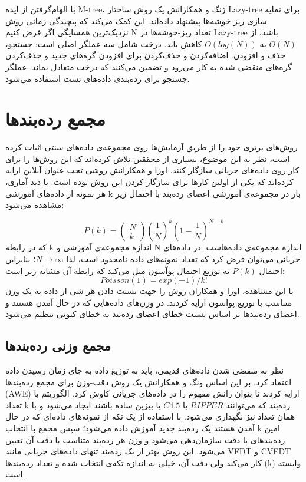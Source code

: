 با الهام‌گرفتن از ایده M-tree، ژنگ و همکارانش  \cite{zhang2011enabling} یک روش ساختار Lazy-tree برای نمایه سازی ریز-خوشه‌ها پیشنهاد داده‌اند. این کمک می‌کند که پیچیدگی زمانی روش‌ نزدیک‌ترین همسایگی اگر فرض کنیم N تعداد ریز-خوشه‌ها در Lazy-tree باشد، از $O(N)$ به $ O(log(N))$ کاهش یابد. درخت شامل سه عملگر اصلی است: جستجو، حذف و افزودن. اضافه‌کردن و حذف‌کردن برای افزودن گره‌های جدید و حذف‌کردن گره‌های منقضی شده به کار‌ می‌رود و تضمین می‌کنند که درخت متعادل بماند. عملگر جستجو برای رده‌بندی داده‌های تست استفاده می‌شود.


\section{مجمع رده‌بندها}
روش‌های
برتری خود را از طریق آزمایش‌ها روی مجموعه‌ی داده‌های سنتی اثبات کرده‌ است، نظر به این موضوع، بسیاری از محققین تلاش کرده‌اند که این روش‌ها را برای کار روی داده‌های جریانی سازگار کنند.
اوزا
و همکارانش \cite{oza2005online} روشی تحت عنوان
آنلاین ارایه کرده‌اند که یکی از اولین‌ کار‌ها برای سازگار کردن این روش بوده است. با دید آماری، هر نمونه از داده‌های آموزشی k بار در مجموعه‌‌ی آموزشی اعضای رده‌بند با احتمال زیر مشاهده می‌شود:

$$
P(k) = \left(\begin{array}{c}N\\ k\end{array}\right)
\left(\frac{1}{N} \right)^{k}
\left(1 - \frac{1}{N} \right)^{N-k}
$$
که در رابطه k اندازه مجموعه‌ی آموزشی و N اندازه مجموعه‌ی داده‌هاست. در داده‌های جریانی می‌توان فرض کرد که تعداد نمونه‌های داده نامحدود است، لذا $N \rightarrow \infty$؛ بنابراین احتمال $ P(k) $ به توزیع احتمال پوآسون میل می‌کند که رابطه آن مشابه زیر است:
$$Poisson(1) = exp(−1)/k!$$
با این مشاهده، اوزا و همکاران روش
را جهت نسبت دادن هر شی از داده به یک وزن متناسب با توزیع پواسون ارایه کردند. در
وزن‌های داده‌هایی که در حال آمدن هستند و اعضای رده‌بندها بر اساس نسبت خطای اعضای رده‌بند به خطای کنونی تنظیم می‌شود.
\subsection{مجمع وزنی رده‌بند‌ها}
نظر به منقضی شدن داده‌های قدیمی، باید به توزیع داده به جای زمان رسیدن داده اعتماد کرد. بر این اساس ونگ
و همکارانش \cite{wang2003mining} یک روش دقت-وزن‌ برای مجمع رده‌بندها
(AWE)
ارایه کردند تا بتوان رانش مفهوم را در داده‌های جریانی کاوش کرد. الگوریتم با تعداد k رده‌بند که می‌توانند $RIPPER$ یا $C4.5$ یا بیزین ساده باشند ایجاد می‌شود و با همان تعداد نیز نگهداری می‌شود. با استفاده از یک تکه از نمونه‌های داده‌ای که در حال آمدن هستند یک رده‌بند جدید آموزش داده می‌شود؛ سپس مجمع با انتخاب k امین رده‌بندهای با دقت سازمان‌دهی می‌شود و وزن هر رده‌بند متناسب با دقت آن تعیین می‌شود. این روش بهتر از یک رده‌بند تنهای داده‌های جریانی مانند VFDT و CVFDT کار می‌کند ولی دقت‌ آن، خیلی به اندازه تکه‌ی انتخاب شده  و تعداد رده‌بندها (k) وابسته است.

